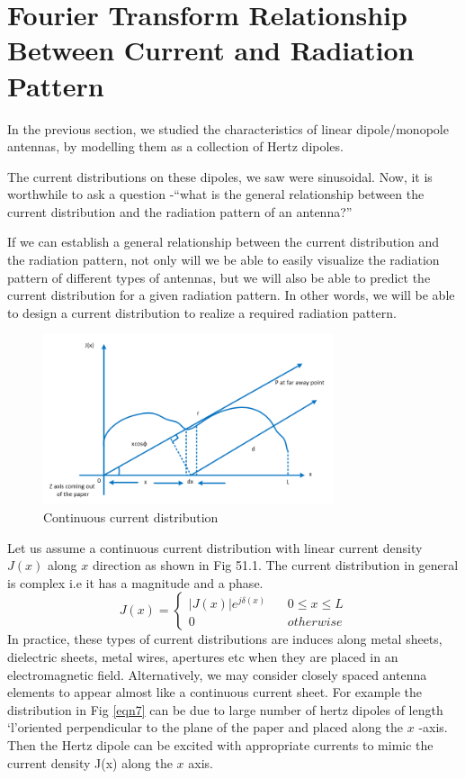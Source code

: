 \chapter{Fourier Transform Relationship Between Current and Radiation Pattern}
In the previous section, we studied the characteristics of linear dipole/monopole antennas, by modelling them as a collection of Hertz dipoles. 

The current distributions on these dipoles, we saw were sinusoidal. Now, it is worthwhile to ask a question -\textquotedblleft what is the general relationship between the current distribution and the radiation pattern of an antenna?\textquotedblright

If we can establish a general relationship between the current distribution and the radiation pattern, not only will we be able to easily visualize the radiation pattern of different types of antennas, but we will also be able to predict the current distribution for a given radiation pattern. In other words, we will be able to design a current distribution to realize a required radiation pattern.
\begin{figure}[h]
\centering
\includegraphics[height=5cm]{./graphics/image53_6}
\caption{Continuous current distribution}
\label{fig:fig6}
\end{figure}

Let us assume a continuous current distribution with linear current density $J(x)$ along $x$ direction as shown in Fig 51.1. The current distribution in general is complex i.e it has a magnitude and a phase.
\begin{equation}
J(x) =
\begin{cases}
|J(x)| e^{j\delta (x)} \ \ \ \ & 0\le x \le L \\
0  & otherwise
\end{cases}
\end{equation}
In practice, these types of current distributions are induces along metal sheets, dielectric sheets, metal wires, apertures etc when they are placed  in an electromagnetic field. Alternatively, we may consider closely spaced antenna elements to appear almost like a continuous current sheet. For example the distribution in Fig \ref{eqn7} can be due to large number of hertz dipoles of length \textquoteleft l\textquoteright oriented perpendicular to the plane of the paper and placed along the $x$ -axis. Then the Hertz dipole can be excited with appropriate currents to mimic the current density J(x) along the $x$ axis.

